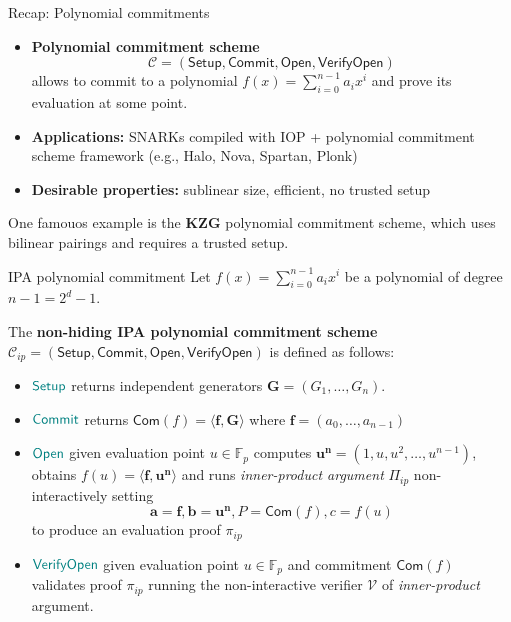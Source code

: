\documentclass{zkdl-presentation-template}
\begin{document}
\begin{frame}{Recap: Polynomial commitments}
    \begin{itemize}
        \item \textbf{Polynomial commitment scheme} $$\mathcal{C} = (\mathsf{Setup}, \mathsf{Commit}, \mathsf{Open}, \mathsf{VerifyOpen})$$ allows to commit to a polynomial $f(x) = \sum_{i=0}^{n-1} a_i x^i$ and prove its evaluation at some point.
        \item \textbf{Applications:} SNARKs compiled with IOP + polynomial commitment scheme framework (e.g., Halo, Nova, Spartan, Plonk)
        \item \textbf{Desirable properties:} sublinear size, efficient, no trusted setup
    \end{itemize}
    \begin{example}
        One famouos example is the \textbf{KZG} polynomial commitment scheme, which uses bilinear pairings and requires a trusted setup.
    \end{example}
\end{frame}

\begin{frame}{IPA polynomial commitment}
    Let $f(x) = \sum_{i=0}^{n-1} a_i x^i$ be a polynomial of degree $n-1=2^d-1$.
    
    The \textbf{non-hiding IPA polynomial commitment scheme} $\mathcal{C}_{ip} = (\mathsf{Setup, Commit, Open, VerifyOpen})$ is defined as follows:
    \begin{itemize}
        \item $\textcolor{teal}{\mathsf{Setup}}$ returns independent generators $\mathbf{G} = (G_1, \dots, G_n)$.
        \item $\textcolor{teal}{\mathsf{Commit}}$ returns $\mathsf{Com}(f) = \langle \mathbf{f}, \mathbf{G} \rangle$ where $\mathbf{f} = (a_0, \dots, a_{n-1})$
        \item $\textcolor{teal}{\mathsf{Open}}$ given evaluation point $u \in \mathbb{F}_p$ computes $\mathbf{u^n} = (1, u, u^2, \dots, u^{n-1})$,  obtains $f(u) = \langle \mathbf{f, u^n} \rangle$ and runs \textit{inner-product argument} $\Pi_{ip}$ non-interactively setting 
        $$\mathbf{a} = \mathbf{f}, \mathbf{b} = \mathbf{u^n}, P = \mathsf{Com}(f), c = f(u)$$ 
        to produce an evaluation proof $\pi_{ip}$
        \item $\textcolor{teal}{\mathsf{VerifyOpen}}$ given evaluation point $u \in \mathbb{F}_p$ and commitment $\mathsf{Com}(f)$ validates proof $\pi_{ip}$ running the non-interactive verifier $\mathcal{V}$ of \textit{inner-product} argument.
    \end{itemize}
\end{frame}
\end{document}
